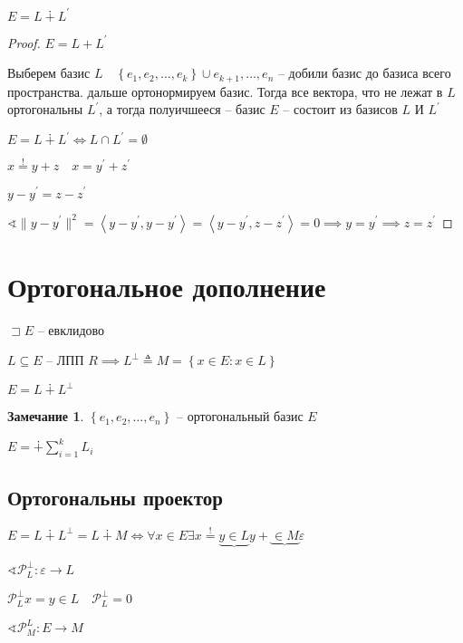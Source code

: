 \documentclass{book}
\renewcommand\O{\ensuremath{\emptyset}}
\newcommand{\p}[1]{#1^{\prime}}
\theoremstyle{definition}
\newtheorem*{note}{Замечание}
\begin{document}
\begin{lemma}
    $E = L \dotplus \p L$
\end{lemma}
\begin{proof}
    $E = L + \p L$

    Выберем базис  $L\quad \left\{ e_1, e_2, \ldots, e_k \right\} \cup {e_{k+1}, \ldots, e_n} $ -- добили базис до базиса всего пространства. дальше ортонормируем базис. Тогда все вектора, что не лежат в $L$ ортогональны  $\p L$, а тогда полуичшееся -- базис $E$ -- состоит из базисов  $L$ И  $\p L$

     $E = L\dotplus \p L \iff  L \cap \p L = \O $

     $x \overset ! = y + z\quad x = \p y + \p z$

     $y - \p y = z - \p z$

      $\sphericalangle \|y - \p y\|^2 = \left<y - \p y, y - \p y \right> = \left<y - \p y, z - \p z \right> = 0 \implies y = \p y \implies z = \p z$
\end{proof}




\section{Ортогональное дополнение}

$\sqsupset E$ -- евклидово

$L \subseteq E$ -- ЛПП $R \implies  L^{\perp} \triangleq M = \left\{ x\in E : x\in L \right\} $

\begin{lemma}
    $E = L \dotplus L^{\perp }$
\end{lemma}
\begin{note}
    $\left\{ e_1, e_2, \ldots, e_n \right\} $ -- ортогональный базис $E$

     $E = \dotplus \sum_{i=1}^{k} L_i$
\end{note}
\subsection{Ортогональны проектор}

$E = L \dotplus L^{\perp} = L\dotplus M  \iff \forall x\in E \exists x \overset ! = \underbrace{y\in L} y + \underbrace{\in M} \varepsilon   $

$\sphericalangle \mathcal P_L^{\perp}: \varepsilon \to  L$

$\mathcal P_L^{\perp} x = y\in L\quad \mathcal P_L^{\perp} = 0 $

$\sphericalangle \mathcal P_M^{L}: E \to  M$ 
\end{document}
